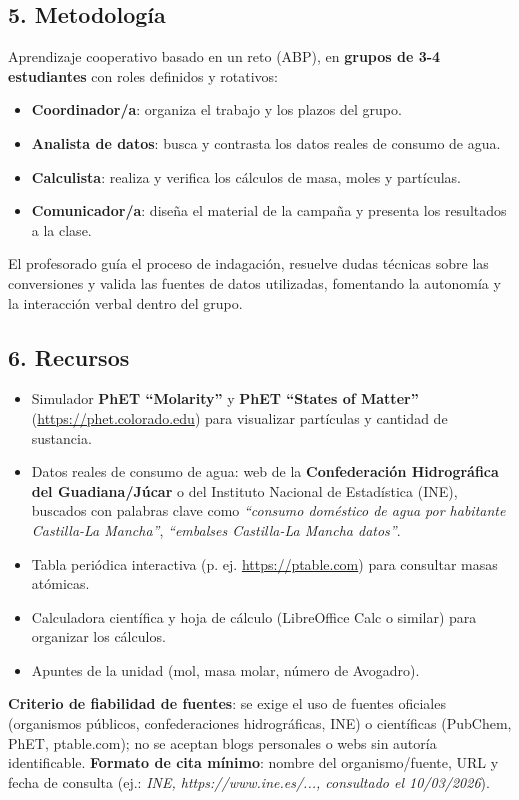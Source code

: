 \documentclass[11pt,a4paper]{article}
\begin{document}
\subsection*{5. Metodología}
Aprendizaje cooperativo basado en un reto (ABP), en \textbf{grupos de 3-4 estudiantes} con roles definidos y rotativos:
\begin{itemize}
    \item \textbf{Coordinador/a}: organiza el trabajo y los plazos del grupo.
    \item \textbf{Analista de datos}: busca y contrasta los datos reales de consumo de agua.
    \item \textbf{Calculista}: realiza y verifica los cálculos de masa, moles y partículas.
    \item \textbf{Comunicador/a}: diseña el material de la campaña y presenta los resultados a la clase.
\end{itemize}
El profesorado guía el proceso de indagación, resuelve dudas técnicas sobre las conversiones y valida las fuentes de datos utilizadas, fomentando la autonomía y la interacción verbal dentro del grupo.

\subsection*{6. Recursos}
\begin{itemize}
    \item Simulador \textbf{PhET ``Molarity''} y \textbf{PhET ``States of Matter''} (\url{https://phet.colorado.edu}) para visualizar partículas y cantidad de sustancia.
    \item Datos reales de consumo de agua: web de la \textbf{Confederación Hidrográfica del Guadiana/Júcar} o del Instituto Nacional de Estadística (INE), buscados con palabras clave como \textit{``consumo doméstico de agua por habitante Castilla-La Mancha''}, \textit{``embalses Castilla-La Mancha datos''}.
    \item Tabla periódica interactiva (p. ej. \url{https://ptable.com}) para consultar masas atómicas.
    \item Calculadora científica y hoja de cálculo (LibreOffice Calc o similar) para organizar los cálculos.
    \item Apuntes de la unidad (mol, masa molar, número de Avogadro).
\end{itemize}
\textbf{Criterio de fiabilidad de fuentes}: se exige el uso de fuentes oficiales (organismos públicos, confederaciones hidrográficas, INE) o científicas (PubChem, PhET, ptable.com); no se aceptan blogs personales o webs sin autoría identificable. \textbf{Formato de cita mínimo}: nombre del organismo/fuente, URL y fecha de consulta (ej.: \textit{INE, https://www.ine.es/..., consultado el 10/03/2026}).
\end{document}
